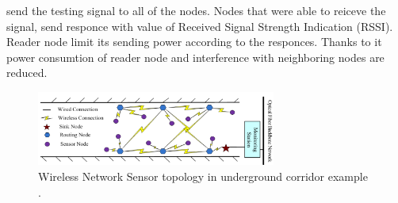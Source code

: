 \documentclass[../main.tex]{subfiles}
\begin{document}
send the testing signal to all of the nodes. Nodes that were able to reiceve the signal, send responce with value of Received Signal Strength Indication (RSSI). Reader node limit its sending power according to the responces. Thanks to it power consumtion of reader node and interference with neighboring nodes are reduced.

\begin{figure}[ht]
\includegraphics[width=0.7\textwidth]{pictures/wsn_topology.png}
\centering
\caption{Wireless Network Sensor topology in underground corridor example \cite{WSN_monitoring}. }
\label{fig:wsn_topology}
\end{figure}
\end{document}
